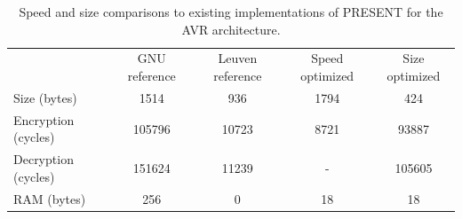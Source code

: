 \documentclass[11pt]{article}
\begin{document}
\begin{table}
	\begin{tabular}{ l | c | c | c | c }
                & GNU reference & Leuven reference & Speed optimized & Size optimized \\
        Size (bytes) & 1514 & 936 & 1794 & 424 \\
        Encryption (cycles) & 105796 & 10723 & 8721 & 93887 \\
        Decryption (cycles) & 151624 & 11239 & - & 105605 \\
        RAM (bytes) & 256 & 0 & 18 & 18
	\end{tabular}
	\caption{Speed and size comparisons to existing implementations of PRESENT for the AVR architecture.}
	\label{numbers}
\end{table}

{}

\end{document}
